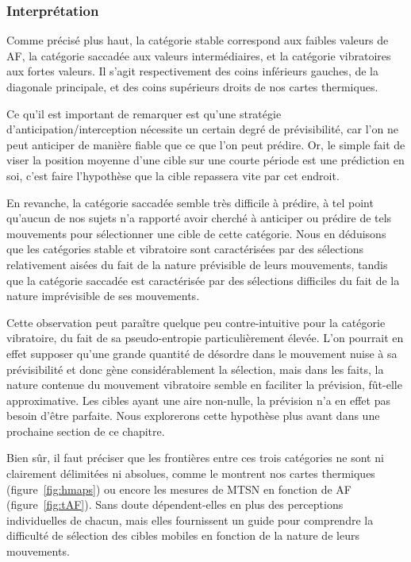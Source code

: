 	\subsubsection{Interprétation}
	Comme précisé plus haut, la catégorie stable correspond aux faibles valeurs de AF, la catégorie saccadée aux valeurs intermédiaires, et la catégorie vibratoires aux fortes valeurs. Il s'agit respectivement des coins inférieurs gauches, de la diagonale principale, et des coins supérieurs droits de nos cartes thermiques.
	
	Ce qu'il est important de remarquer est qu'une stratégie d'anticipation/interception nécessite un certain degré de prévisibilité, car l'on ne peut anticiper de manière fiable que ce que l'on peut prédire. Or, le simple fait de viser la \og position moyenne \fg{} d'une cible sur une courte période est une prédiction en soi, c'est faire l'hypothèse que la cible repassera vite par cet endroit.
	
	En revanche, la catégorie saccadée semble très difficile à prédire, à tel point qu'aucun de nos sujets n'a rapporté avoir cherché à anticiper ou prédire de tels mouvements pour sélectionner une cible de cette catégorie. Nous en déduisons que les catégories stable et vibratoire sont caractérisées par des sélections relativement aisées du fait de la nature prévisible de leurs mouvements, tandis que la catégorie saccadée est caractérisée par des sélections difficiles du fait de la nature imprévisible de ses mouvements.
	
	Cette observation peut paraître quelque peu contre-intuitive pour la catégorie vibratoire, du fait de sa pseudo-entropie particulièrement élevée. L'on pourrait en effet supposer qu'une grande quantité de désordre dans le mouvement nuise à sa prévisibilité et donc gène considérablement la sélection, mais dans les faits, la nature \og contenue \fg{} du mouvement vibratoire semble en faciliter la prévision, fût-elle approximative. Les cibles ayant une aire non-nulle, la prévision n'a en effet pas besoin d'être parfaite. Nous explorerons cette hypothèse plus avant dans une prochaine section de ce chapitre.
	
	Bien sûr, il faut préciser que les frontières entre ces trois catégories ne sont ni clairement délimitées ni absolues, comme le montrent nos cartes thermiques (figure~\ref{fig:hmaps}) ou encore les mesures de MTSN en fonction de AF (figure~\ref{fig:tAF}). Sans doute dépendent-elles en plus des perceptions individuelles de chacun, mais elles fournissent un guide pour comprendre la difficulté de sélection des cibles mobiles en fonction de la nature de leurs mouvements.
	
